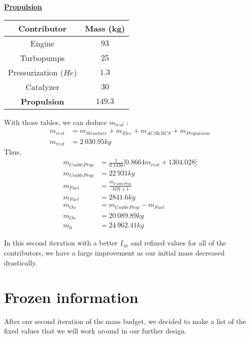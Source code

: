 \textbf{\underline{Propulsion}}
\begin{center}
\begin{tabular}[H]{|c|c|}
	\hline
	\cellcolor{gray!50}Contributor & \cellcolor{gray!50}Mass (kg)\\
	\hline
	Engine & $93$\\
	\hline
	Turbopumps & $25$\\
	\hline
	Pressurization ($He$) & $1.3$\\
	\hline
	Catalyzer & $30$\\
	\hline
	\cellcolor{green!30}\textbf{Propulsion} & \textbf{$149.3$}\\
	\hline
\end{tabular}
\end{center}

With those tables, we can deduce $m_{rest}$ :
\begin{align}
m_{rest} &= m_{Structure} + m_{Elec} + m_{ACS\&RCS} + m_{Propulsion}\\
m_{rest} &= 2\ 030.95kg
\end{align}
Thus,
\begin{align}
m_{UsableProp} &= \frac 1{0.1336}\bigg[0.8664 m_{rest} + 1304.028\bigg]\\
m_{UsableProp} &= 22\ 931kg\\
m_{Fuel} &= \frac{m_{UsableProp}}{MR+1}\\
m_{Fuel} &= 2841.6kg\\
m_{Ox} &= m_{UsableProp} - m_{Fuel}\\
m_{Ox} &= 20\ 089.89kg\\
m_0 &= 24\ 962.41kg
\end{align}



In this second iteration with a better \(I_{sp}\) and refined values for all of the contributors, we have a large improvement as our initial mass decreased drastically.
\newpage
\section{Frozen information}
After our second iteration of the mass budget, we decided to make a list of the fixed values that we will work around in our further design.
